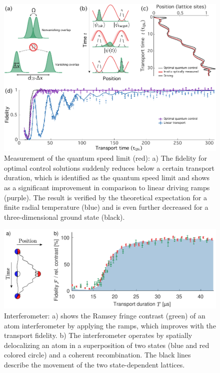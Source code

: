 \documentclass[aps,pra,reprint,a4paper,nofootinbib,superscriptaddress,numbers,longbibliography,showpacs,showkeys,floatfix]{revtex4-1}
\begin{document}
\begin{figure}
	\centering
	\includegraphics[width=\textwidth]{figure3}
	\caption[]{Measurement of the quantum speed limit (red): a) The fidelity for optimal control solutions suddenly reduces below a certain transport duration, which is identified as the quantum speed limit and shows as a significant improvement in comparison to linear driving ramps (purple). The result is verified by the theoretical expectation for a finite radial temperature (blue) and is even further decreased for a three-dimensional ground state (black).}
	\label{Fig:QSL_measurement}
\end{figure}
\begin{figure}
	\centering
	\includegraphics[width=\textwidth]{figure4}
	\caption[]{Interferometer: a) shows the Ramsey fringe contrast (green) of an atom interferometer by applying the ramps, which improves with the transport fidelity. b) The interferometer operates by spatially delocalizing an atom in a superposition of two states (blue and red colored circle) and a coherent recombination. The black lines describe the movement of the two state-dependent lattices.}
	\label{Fig:Interferometer}
\end{figure}



\end{document}
